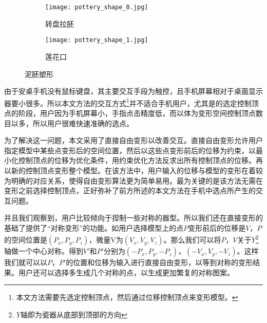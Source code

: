 \begin{figure}[htbp]
	\centering
	\begin{subfigure}[b]{.4\textwidth}
		\centering
		\texttt{[image: pottery\_shape\_0.jpg]}
		\caption{转盘拉胚}\label{subfig:pottery_shape_0}
	\end{subfigure}
	\begin{subfigure}[b]{.4\textwidth}
		\centering
		\texttt{[image: pottery\_shape\_1.jpg]}
		\caption{莲花口}\label{subfig:pottery_shape_1}
	\end{subfigure}
	\caption{泥胚塑形}\label{fig:pottery_shape}
\end{figure}

由于安桌手机没有鼠标键盘，其主要交互手段为触控，且手机屏幕相对于桌面显示器要小很多。所以本文方法的交互方式\footnote{本文方法需要先选定控制顶点，然后通过位移控制顶点来变形模型。}并不适合手机用户，尤其是的选定控制顶点的阶段，用户因为手机屏幕小，手指点击精度低，而以体为变形空间控制顶点数目以多，所以用户很难快速准确的选点。

为了解决这一问题，本文采用了直接自由变形\cite{hsu1992}以改善交互。直接自由变形允许用户指定模型中某些点变形后的空间位置，然后以这些点变形前后的位移为约束，以最小化控制顶点的位移为优化条件，用约束优化方法反求出所有控制顶点的位移。再以新的控制顶点变形整个模型。在该方法中，用户输入的位移与模型的变形在着较为明确的对应关系，使得自由变形算法更为简单易用。最为关键的是该方法无需在变形之前选择控制顶点，正好弥补了前方所述的本文方法在手机中选点所产生的交互问题。

并且我们观察到，用户比较倾向于捏制一些对称的器型。所以我们还在直接变形的基础了提供了“对称变形”的功能。如用户选择模型上的点$P$变形前后的位移是$V$，$P$的空间位置是$(P_x, P_y, P_z)$，微量V为$(V_x, V_y, V_z)$。那么我们可以将$P$，$V$关于$Y$\footnote{$Y$轴即为瓷器从底部到顶部的方向}轴做一个中心对称。得到$V'$和$P'$分别为$(-P_x, P_y, -P_z)$，$(-V_x, V_y, -V_z)$。这样我们就可以以$P$，$P'$的位置和位移为输入进行直接自由变形，以等到对称的变形结果。用户还可以选择多生成几个对称的点，以生成更加繁复的对称图案。
